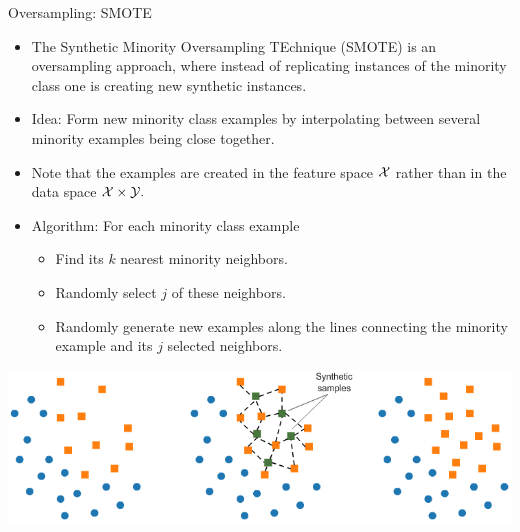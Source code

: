 	\begin{frame}{Oversampling: SMOTE}
		\footnotesize
		\begin{itemize}
			\item The Synthetic Minority Oversampling TEchnique (SMOTE) is an oversampling approach, where instead of replicating instances of the minority class one is creating new synthetic instances.
%			
			\item Idea: Form new minority class examples by interpolating between several minority examples being close together.
			\item Note that the examples are created in the feature space $\mathcal{X}$ rather than in the data space $\mathcal{X}\times\mathcal{Y}.$
%			
			\item Algorithm: For each minority class example 
%			
			\begin{itemize} \footnotesize
%				
				\item Find its $k$ nearest minority neighbors.
%				
				\item Randomly select $j$ of these neighbors.
%				
				\item Randomly generate new examples along the lines connecting the minority example and its $j$ selected neighbors.
%				
			\end{itemize}
		\end{itemize}
%	
		\includegraphics{figure/SMOTE.png} 
	\end{frame}
	
